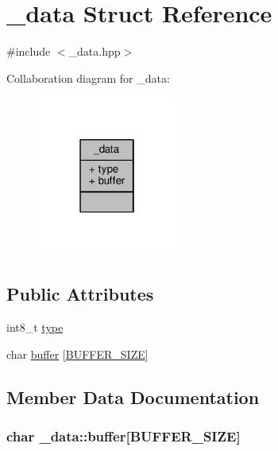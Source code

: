 \hypertarget{struct__data}{}\section{\+\_\+data Struct Reference}
\label{struct__data}


{\ttfamily \#include $<$\+\_\+data.\+hpp$>$}



Collaboration diagram for \+\_\+data\+:\nopagebreak
\begin{figure}[H]
\begin{center}
\leavevmode
\includegraphics[width=130pt]{struct__data__coll__graph}
\end{center}
\end{figure}
\subsection*{Public Attributes}
\begin{DoxyCompactItemize}
\item 
int8\+\_\+t \hyperlink{struct__data_afa7c65aa86c5c877d1b23746b27f7ccd}{type}
\item 
char \hyperlink{struct__data_abcb37fabf89158d59a0469a376d2d5f8}{buffer} \mbox{[}\hyperlink{__data_8hpp_a6b20d41d6252e9871430c242cb1a56e7}{B\+U\+F\+F\+E\+R\+\_\+\+S\+I\+Z\+E}\mbox{]}
\end{DoxyCompactItemize}


\subsection{Member Data Documentation}
\hypertarget{struct__data_abcb37fabf89158d59a0469a376d2d5f8}{}
\subsubsection[{buffer}]{\setlength{\rightskip}{0pt plus 5cm}char \+\_\+data\+::buffer\mbox{[}{\bf B\+U\+F\+F\+E\+R\+\_\+\+S\+I\+Z\+E}\mbox{]}}\label{struct__data_abcb37fabf89158d59a0469a376d2d5f8}
\hypertarget{struct__data_afa7c65aa86c5c877d1b23746b27f7ccd}{}
